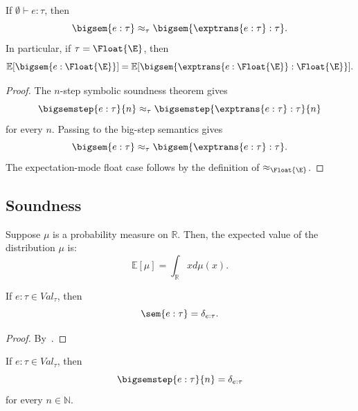 \begin{theorem}
  If \(\emptyset \vdash e : \tau\), then
  \[
    \bigsem{e : \tau}
    \approx_\tau
    \bigsem{\exptrans{e : \tau} : \tau}.
  \]
  In particular, if \(\tau = \Float{\E}\), then
  \[
    \mathbb{E}[\bigsem{e : \Float{\E}}]
    =
    \mathbb{E}[\bigsem{\exptrans{e : \Float{\E}} : \Float{\E}}].
  \]
\end{theorem}

\begin{proof}
  The \(n\)-step symbolic soundness theorem gives
  \[
    \bigsemstep{e : \tau}{n}
    \approx_\tau
    \bigsemstep{\exptrans{e : \tau} : \tau}{n}
  \]
  for every \(n\).  Passing to the big-step semantics gives
  \[
    \bigsem{e : \tau}
    \approx_\tau
    \bigsem{\exptrans{e : \tau} : \tau}.
  \]
  The expectation-mode float case follows by the definition of
  \(\approx_{\Float{\E}}\).
\end{proof}

\subsection{Soundness}
\begin{definition}
  Suppose $\mu$ is a probability measure on $\mathbb{R}$. Then, the expected value of the distribution $\mu$ is:
  \[
    \mathbb{E}[\mu] = \int_{\mathbb{R}} x d\mu(x).
  \]
\end{definition}

\begin{lemma}\label{lem:one-step-value}
  If $e : \tau \in Val_{\tau}$, then 
  \[
    \sem{e : \tau} = \delta_{e : \tau}.
  \]
\end{lemma}

\begin{proof}
  By~.
\end{proof}

\begin{lemma}\label{lem:nstep-value}
  If $e : \tau \in Val_{\tau}$, then
  \[
    \bigsemstep{e : \tau}{n} = \delta_{e : \tau}
  \]
  for every $n \in \mathbb{N}$.
\end{lemma}

